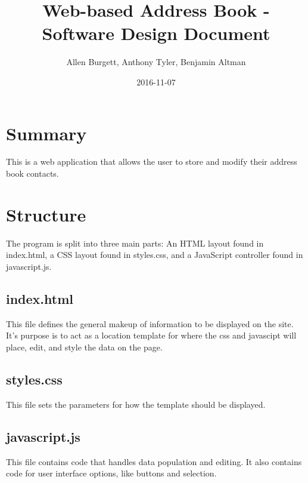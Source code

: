 \documentclass{article}
\title{Web-based Address Book - Software Design Document}
\date{2016-11-07}
\author{Allen Burgett, Anthony Tyler, Benjamin Altman}
\begin{document}
\maketitle
\pagebreak


\section{Summary}
This is a web application that allows the user to store and modify their address book contacts.

\section{Structure}
The program is split into three main parts: An HTML layout found in index.html, a CSS layout found in styles.css, and a JavaScript controller found in javascript.js.

\subsection{index.html}
This file defines the general makeup of information to be displayed on the site. It's purpose is to act as a location template for where the css and javascipt will place, edit, and style the data on the page.

\subsection{styles.css}
This file sets the parameters for how the template should be displayed.

\subsection{javascript.js}
This file contains code that handles data population and editing. It also contains code for user interface options, like buttons and selection. 
\end{document}
